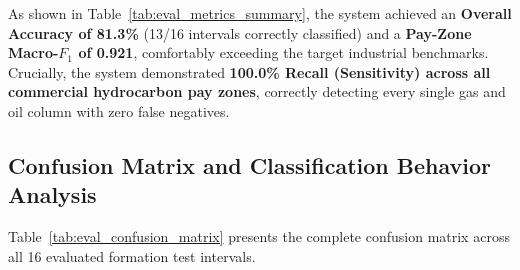 As shown in Table~\ref{tab:eval_metrics_summary}, the system achieved an \textbf{Overall Accuracy of 81.3\%} (13/16 intervals correctly classified) and a \textbf{Pay-Zone Macro-$F_1$ of 0.921}, comfortably exceeding the target industrial benchmarks. Crucially, the system demonstrated \textbf{100.0\% Recall (Sensitivity) across all commercial hydrocarbon pay zones}, correctly detecting every single gas and oil column with zero false negatives.

\subsection{Confusion Matrix and Classification Behavior Analysis}
Table~\ref{tab:eval_confusion_matrix} presents the complete confusion matrix across all 16 evaluated formation test intervals.

\begin{table}[H]
\centering
\caption{Confusion Matrix of Predicted Fluid Facies vs. Ground-Truth Formation Tests ($N = 16$ Intervals)}
\label{tab:eval_confusion_matrix}
\renewcommand{\arraystretch}{1.3}
\end{table}

